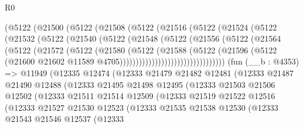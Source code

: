 \begin{lexlean}{R0}
\begin{coremodule}
              (@5122
                (@21500
                  (@5122
                    (@21508
                      (@5122
                        (@21516
                          (@5122
                            (@21524
                              (@5122
                                (@21532
                                  (@5122
                                    (@21540
                                      (@5122
                                        (@21548
                                          (@5122
                                            (@21556
                                              (@5122
                                                (@21564
                                                  (@5122
                                                    (@21572
                                                      (@5122
                                                        (@21580
                                                          (@5122
                                                            (@21588
                                                              (@5122
                                                                (@21596
                                                                  (@5122
                                                                    (@21600
                                                                      @21602
                                                                      @11589
                                                                      @4705)))))))))))))))))))))))))))))))))
    (fun (__b : @4353) =>
    @11949
      (@12335
        @12474
        (@12333
          @21479
          @21482
          @12481
          (@12333
            @21487
            @21490
            @12488
            (@12333
              @21495
              @21498
              @12495
              (@12333
                @21503
                @21506
                @12502
                (@12333
                  @21511
                  @21514
                  @12509
                  (@12333
                    @21519
                    @21522
                    @12516
                    (@12333
                      @21527
                      @21530
                      @12523
                      (@12333
                        @21535
                        @21538
                        @12530
                        (@12333
                          @21543
                          @21546
                          @12537
                          (@12333

\end{coremodule}
\end{lexlean}
